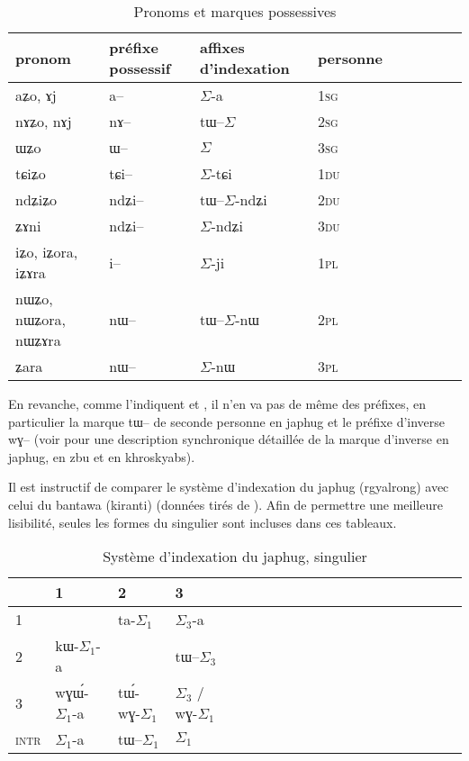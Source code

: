 \documentclass[oldfontcommands,oneside,a4paper,11pt]{article}
\newcommand{\ipa}[1]{{\phon \mbox{#1}}} %
\newcommand{\grise}[1]{\cellcolor{lightgray}\textbf{#1}}
\newcommand{\ra}{$\Sigma_1$}
\newcommand{\rc}{$\Sigma_3$}
\newcommand{\ro}{$\Sigma$}
\begin{document}
   
\begin{table}[H] \centering
\caption{Pronoms et marques possessives }\label{tab:pronoms}
\begin{tabular}{lllllllll} 
\toprule
pronom & préfixe possessif & affixes d'indexation& personne \\
\midrule
 \ipa{aʑo},    \ipa{ɤj} &	\ipa{a--}  &	\ro{}-\ipa{a}	& 1\textsc{sg} \\
\ipa{nɤʑo},  \ipa{nɤj} &	\ipa{nɤ--}  &	\ipa{tɯ--}\ro{} &		2\textsc{sg}\\
\ipa{ɯʑo}  &	\ipa{ɯ--}  &	\ro{} 	&	3\textsc{sg}\\
\midrule
\ipa{tɕiʑo}  &	\ipa{tɕi--}  &			\ro{}-\ipa{tɕi}	&	1\textsc{du} \\
\ipa{ndʑiʑo}  &	\ipa{ndʑi--}  &		\ipa{tɯ--}\ro{}-\ipa{ndʑi} &		2\textsc{du} \\	
\ipa{ʑɤni}  &	\ipa{ndʑi--}  &	\ro{}-\ipa{ndʑi} &		3\textsc{du} \\	
\midrule
\ipa{iʑo}, \ipa{iʑora},   \ipa{iʑɤra}   &	\ipa{i--}  &	\ro{}-\ipa{ji}	&		1\textsc{pl} \\
\ipa{nɯʑo}, \ipa{nɯʑora},   \ipa{nɯʑɤra}  &	\ipa{nɯ--}  &	\ipa{tɯ--}\ro{}-\ipa{nɯ} &			2\textsc{pl} \\
\ipa{ʑara}  &	\ipa{nɯ--}  &			\ro{}-\ipa{nɯ} &3\textsc{pl} \\
\bottomrule
\end{tabular}
\end{table}


En revanche, comme l'indiquent \citet{jacques12agreement} et \citealt{delancey14second}, il n'en va pas de même des préfixes, en particulier la marque \ipa{tɯ--} de seconde personne en japhug et le préfixe d'inverse \ipa{wɣ--} (voir \citealt{jacques10inverse, gongxun14agreement, lai14person} pour une description synchronique détaillée de la marque d'inverse en japhug, en zbu et en khroskyabs).

Il est instructif de comparer le système d'indexation du japhug (rgyalrong) avec celui du bantawa (kiranti) (données tirés de \citealt{jacques10inverse, doornenbal09}). Afin de permettre une meilleure lisibilité, seules les formes du singulier sont incluses dans ces tableaux.

 

\begin{table}
\caption{Système d'indexation du japhug, singulier} \centering \label{tab:japhug}
\begin{tabular}{l|lllllllllllllllllll}
\toprule
&1 & 2 &3 &\\
\midrule
1 &\grise{}&\ipa{ta}-\ra{} & \rc{}-\ipa{a}	 \\
2 &\ipa{kɯ}-\ra{}-\ipa{a}	 &\grise{} &\ipa{tɯ--}\rc{} \\
3 &\ipa{wɣɯ́-}\ra{}-\ipa{a}&\ipa{tɯ́-wɣ-}\ra{}& \rc{} / \ipa{wɣ}-\ra{}\\
\midrule
\textsc{intr} & \ra{}-\ipa{a}&\ipa{tɯ--}\ra{}&\ra{} \\
\bottomrule
\end{tabular}
\end{table}
\end{document}
